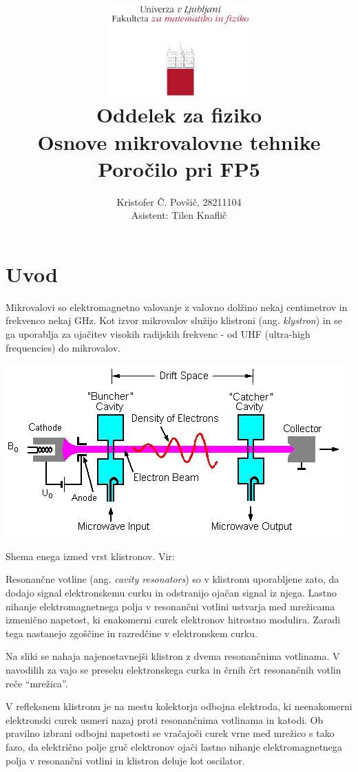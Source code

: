\documentclass[11pt]{article}
\title{
  \includegraphics[width=0.4\textwidth]{fmf_logo}\\
  {\small Oddelek za fiziko} \\
  {Osnove mikrovalovne tehnike}\\
  {\small Poročilo pri FP5}\\

}
\date{}
\author{ Kristofer Č. Povšič, 28211104 \\[5 cm]
 \small  Asistent: Tilen Knaflič \\
}
\begin{document}
\maketitle
\newpage
\tableofcontents

\setcounter{page}{2}
\section{Uvod}\label{sec:org9f570f6}

Mikrovalovi so elektromagnetno valovanje z valovno dolžino nekaj centimetrov in frekvenco nekaj GHz. Kot izvor mikrovalov služijo klistroni (ang. \emph{klystron}) in se ga uporablja za ojačitev visokih radijskih frekvenc - od UHF (ultra-high frequencies) do mikrovalov.

\begin{slika}[H]
  \begin{center}
    \includegraphics[width=.9\linewidth]{./figures/Klystron}
    \caption{\small Shema enega izmed vrst klistronov. Vir: \cite{noauthor_klystron_2024}}\label{fig:1}
  \end{center}
\end{slika}


Resonančne votline (ang. \emph{cavity resonators}) so v klistronu uporabljene zato, da dodajo signal elektronskemu curku in odstranijo ojačan signal iz njega. Lastno nihanje elektromagnetnega polja v resonančni votlini ustvarja med mrežicama izmenično napetost, ki enakomerni curek elektronov hitrostno modulira. Zaradi tega nastanejo zgoščine in razredčine v elektronskem curku.

Na sliki se nahaja najenostavnejši klistron z dvema resonančnima votlinama. V navodilih za vajo se preseku elektronskega curka in črnih črt resonančnih votlin reče ``mrežica''.

V refleksnem klistronu je na mestu kolektorja odbojna elektroda, ki neenakomerni elektronski curek usmeri nazaj proti resonančnima votlinama in katodi. Ob pravilno izbrani odbojni napetosti se vračajoči curek vrne med mrežico s tako fazo, da električno polje gruč elektronov ojači lastno nihanje elektromagnetnega polja v resonančni votlini in klistron deluje kot oscilator.
\end{document}
